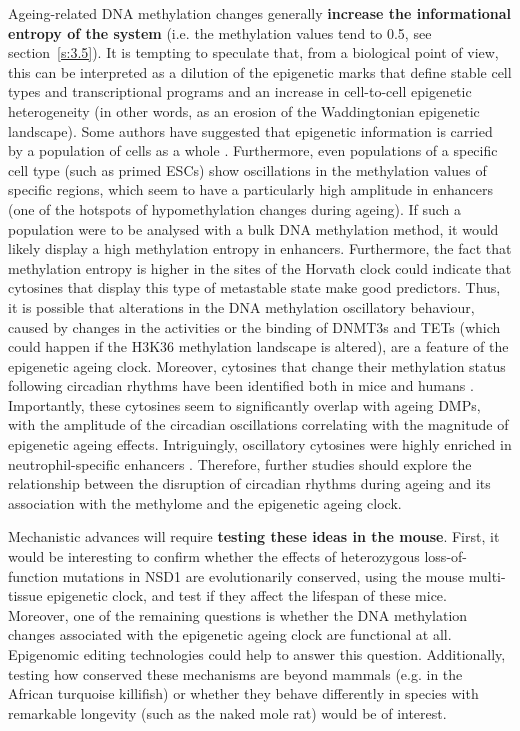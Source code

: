 Ageing-related DNA methylation changes generally \textbf{increase the informational entropy of the system} (i.e. the methylation values tend to 0.5, see section~\ref{s:3.5}). It is tempting to speculate that, from a biological point of view, this can be interpreted as a dilution of the epigenetic marks that define stable cell types and transcriptional programs and an increase in cell-to-cell epigenetic heterogeneity (in other words, as an erosion of the Waddingtonian epigenetic landscape). Some authors have suggested that epigenetic information is carried by a population of cells as a whole \citep{Jenkinson2017,Shipony2014}. Furthermore, even populations of a specific cell type (such as primed \acrshort{ESCs}) show oscillations in the methylation values of specific regions, which seem to have a particularly high amplitude in enhancers \citep{Rulands2018} (one of the hotspots of hypomethylation changes during ageing). If such a population were to be analysed with a bulk DNA methylation method, it would likely display a high methylation entropy in enhancers. Furthermore, the fact that methylation entropy is higher in the sites of the Horvath clock could indicate that cytosines that display this type of metastable state make good predictors. Thus, it is possible that alterations in the DNA methylation oscillatory behaviour, caused by changes in the activities or the binding of DNMT3s and TETs (which could happen if the H3K36 methylation landscape is altered), are a feature of the epigenetic ageing clock. Moreover, cytosines that change their methylation status following circadian rhythms have been identified both in mice \citep{Oh2018} and humans \citep{Oh2019}. Importantly, these cytosines seem to significantly overlap with ageing \acrshort{DMPs}, with the amplitude of the circadian oscillations correlating with the magnitude of epigenetic ageing effects. Intriguingly, oscillatory cytosines were highly enriched in neutrophil-specific enhancers \citep{Oh2019}. Therefore, further studies should explore the relationship between the disruption of circadian rhythms during ageing and its association with the methylome and the epigenetic ageing clock.

\bigskip

Mechanistic advances will require \textbf{testing these ideas in the mouse}. First, it would be interesting to confirm whether the effects of heterozygous loss-of-function mutations in NSD1 are evolutionarily conserved, using the mouse multi-tissue epigenetic clock, and test if they affect the lifespan of these mice. Moreover, one of the remaining questions is whether the DNA methylation changes associated with the epigenetic ageing clock are functional at all. Epigenomic editing technologies \citep{Liu2016a} could help to answer this question. Additionally, testing how conserved these mechanisms are beyond mammals (e.g. in the African turquoise killifish) or whether they behave differently in species with remarkable longevity (such as the naked mole rat) would be of interest. 

